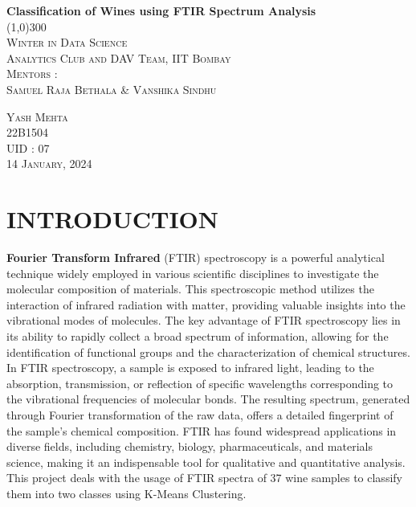 \documentclass{article}
\begin{document}
\begin{titlepage}
	\begin{center}
	\huge{\bfseries Classification of Wines using FTIR Spectrum Analysis}\\
	\line(1,0){300}\\
	[0.1in]
	\textsc{\LARGE Winter in Data Science} \\
	\textsc{\large Analytics Club and DAV Team, IIT Bombay}\\
	[3cm]
	\textsc{\Large 
	Mentors :\\ 
	[-0.3cm]
	Samuel Raja Bethala \& Vanshika Sindhu}\\
	[8 cm]
	\end{center}
	\begin{flushright}
	\textsc{\Large Yash Mehta}\\
	\textsc{\large
	22B1504\\
	UID : 07\\
	14 January, 2024}\\
	\end{flushright}	
\end{titlepage}
\tableofcontents
\thispagestyle{empty}
\cleardoublepage
\setcounter{page}{1}



\section{INTRODUCTION}\label{sec:intro}
\textbf{Fourier Transform Infrared} (FTIR) spectroscopy is a powerful analytical technique widely employed in various scientific disciplines to investigate the molecular composition of materials. This spectroscopic method utilizes the interaction of infrared radiation with matter, providing valuable insights into the vibrational modes of molecules. The key advantage of FTIR spectroscopy lies in its ability to rapidly collect a broad spectrum of information, allowing for the identification of functional groups and the characterization of chemical structures.\\
\newline
In FTIR spectroscopy, a sample is exposed to infrared light, leading to the absorption, transmission, or reflection of specific wavelengths corresponding to the vibrational frequencies of molecular bonds. The resulting spectrum, generated through Fourier transformation of the raw data, offers a detailed fingerprint of the sample's chemical composition. FTIR has found widespread applications in diverse fields, including chemistry, biology, pharmaceuticals, and materials science, making it an indispensable tool for qualitative and quantitative analysis.\\ 
\newline
This project deals with the usage of FTIR spectra of 37 wine samples to classify them into two classes using K-Means Clustering.\\ 
[2cm]
\end{document}
